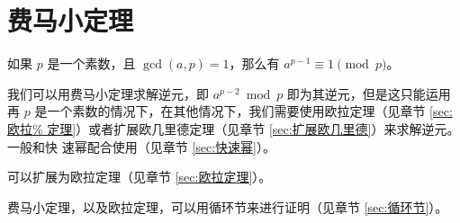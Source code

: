 \section{费马小定理} \label{sec:费马小定理}
如果 $p$ 是一个素数，且 $\gcd(a, p) = 1$，那么有 $a^{p-1} \equiv 1 \pmod p$。

我们可以用费马小定理求解逆元，即 $a^{p-2} \bmod p$ 即为其逆元，但是这只能运用再
$p$ 是一个素数的情况下，在其他情况下，我们需要使用欧拉定理（见章节 \ref{sec:欧拉%
定理}）或者扩展欧几里德定理（见章节 \ref{sec:扩展欧几里德}）来求解逆元。一般和快
速幂配合使用（见章节 \ref{sec:快速幂}）。

可以扩展为欧拉定理（见章节 \ref{sec:欧拉定理}）。

费马小定理，以及欧拉定理，可以用循环节来进行证明（见章节 \ref{sec:循环节}）。
